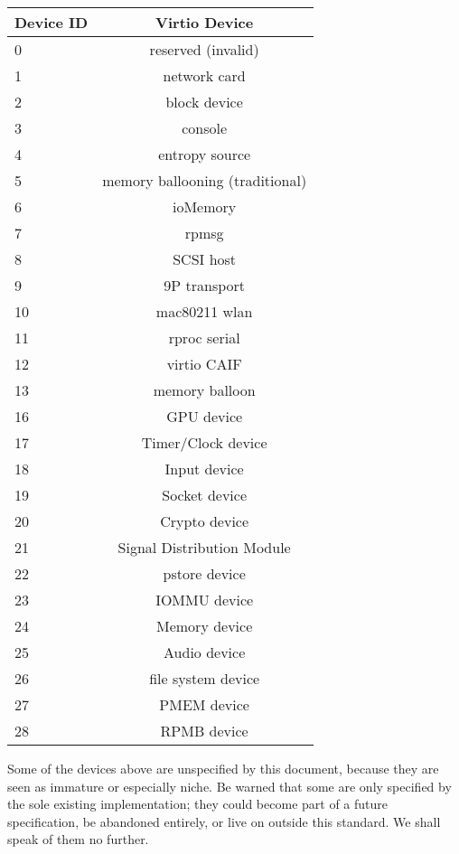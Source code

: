 \begin{tabular} { |l|c| }
\hline
Device ID  &  Virtio Device    \\
\hline \hline
0          & reserved (invalid) \\
\hline
1          &   network card     \\
\hline
2          &   block device     \\
\hline
3          &      console       \\
\hline
4          &  entropy source    \\
\hline
5          & memory ballooning (traditional)  \\
\hline
6          &     ioMemory       \\
\hline
7          &       rpmsg        \\
\hline
8          &     SCSI host      \\
\hline
9          &   9P transport     \\
\hline
10         &   mac80211 wlan    \\
\hline
11         &   rproc serial     \\
\hline
12         &   virtio CAIF      \\
\hline
13         &  memory balloon    \\
\hline
16         &   GPU device       \\
\hline
17         &   Timer/Clock device \\
\hline
18         &   Input device \\
\hline
19         &   Socket device \\
\hline
20         &   Crypto device \\
\hline
21         &   Signal Distribution Module \\
\hline
22         &   pstore device \\
\hline
23         &   IOMMU device \\
\hline
24         &   Memory device \\
\hline
25         &   Audio device \\
\hline
26         &   file system device \\
\hline
27         &   PMEM device \\
\hline
28         &   RPMB device \\
\hline
\end{tabular}

Some of the devices above are unspecified by this document,
because they are seen as immature or especially niche.  Be warned
that some are only specified by the sole existing implementation;
they could become part of a future specification, be abandoned
entirely, or live on outside this standard.  We shall speak of
them no further.

